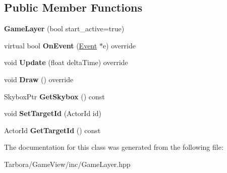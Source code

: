 \subsection*{Public Member Functions}
\begin{DoxyCompactItemize}
\item 
\mbox{\label{classTarbora_1_1GameLayer_a3847c040b2c15631e725e8c6ce5ad45b}} 
{\bfseries Game\+Layer} (bool start\+\_\+active=true)
\item 
\mbox{\label{classTarbora_1_1GameLayer_a8721890fc92132ba29840cd5a6660cb0}} 
virtual bool {\bfseries On\+Event} (\hyperlink{structTarbora_1_1Event}{Event} $\ast$e) override
\item 
\mbox{\label{classTarbora_1_1GameLayer_a0e9a1674da8efb1c22e38afd38db8712}} 
void {\bfseries Update} (float delta\+Time) override
\item 
\mbox{\label{classTarbora_1_1GameLayer_a4f511121ff4d7a0b3b93e62c047b3a7e}} 
void {\bfseries Draw} () override
\item 
\mbox{\label{classTarbora_1_1GameLayer_acc5698563557cb438eb3cc10ef6fef43}} 
Skybox\+Ptr {\bfseries Get\+Skybox} () const
\item 
\mbox{\label{classTarbora_1_1GameLayer_a9a20a0c5d3a1bde8ebb1560771787513}} 
void {\bfseries Set\+Target\+Id} (Actor\+Id id)
\item 
\mbox{\label{classTarbora_1_1GameLayer_a18d2cdf99a18fa88bf2c91f8093d9921}} 
Actor\+Id {\bfseries Get\+Target\+Id} () const
\end{DoxyCompactItemize}


The documentation for this class was generated from the following file\+:\begin{DoxyCompactItemize}
\item 
Tarbora/\+Game\+View/inc/Game\+Layer.\+hpp\end{DoxyCompactItemize}
